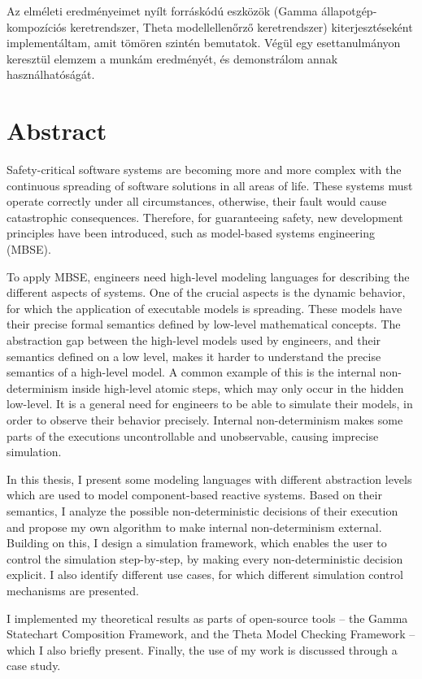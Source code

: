 Az elméleti eredményeimet nyílt forráskódú eszközök (Gamma állapotgép-kompozíciós keretrendszer, Theta modellellenőrző keretrendszer) kiterjesztéseként implementáltam, amit tömören szintén bemutatok. Végül egy esettanulmányon keresztül elemzem a munkám eredményét, és demonstrálom annak használhatóságát.

\vfill
\selectenglish


\chapter*{Abstract}

Safety-critical software systems are becoming more and more complex with the continuous spreading of software solutions in all areas of life. These systems must operate correctly under all circumstances, otherwise, their fault would cause catastrophic consequences. Therefore, for guaranteeing safety, new development principles have been introduced, such as model-based systems engineering (MBSE).

To apply MBSE, engineers need high-level modeling languages for describing the different aspects of systems. One of the crucial aspects is the dynamic behavior, for which the application of executable models is spreading. These models have their precise formal semantics defined by low-level mathematical concepts. The abstraction gap between the high-level models used by engineers, and their semantics defined on a low level, makes it harder to understand the precise semantics of a high-level model. A common example of this is the internal non-determinism inside high-level atomic steps, which may only occur in the hidden low-level. It is a general need for engineers to be able to simulate their models, in order to observe their behavior precisely. Internal non-determinism makes some parts of the executions uncontrollable and unobservable, causing imprecise simulation.

In this thesis, I present some modeling languages with different abstraction levels which are used to model component-based reactive systems. Based on their semantics, I analyze the possible non-deterministic decisions of their execution and propose my own algorithm to make internal non-determinism external. Building on this, I design a simulation framework, which enables the user to control the simulation step-by-step, by making every non-deterministic decision explicit. I also identify different use cases, for which different simulation control mechanisms are presented.

I implemented my theoretical results as parts of open-source tools -- the Gamma Statechart Composition Framework, and the Theta Model Checking Framework -- which I also briefly present. Finally, the use of my work is discussed through a case study.

\vfill
\cleardoublepage

\selectthesislanguage

\setcounter{romanPage}{\value{page}}
